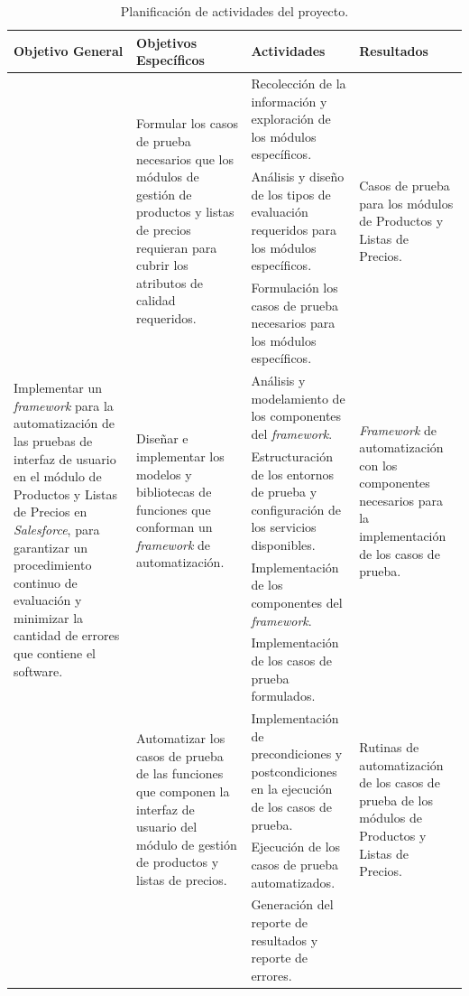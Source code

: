 \begin{table}
\renewcommand{\arraystretch}{1}
\linespread{1.25}
\centering
\small
\begin{tabular}{|l|l|p{6.5cm}|l|}
\hline
Objetivo General & Objetivos Específicos & Actividades & Resultados \\
\hline
\multirow{10}{4.0cm}{Implementar un \emph{framework} para la automatización de
las pruebas de interfaz de usuario en el módulo de Productos y Listas de Precios
en \emph{Salesforce}, para garantizar un procedimiento continuo de evaluación y
minimizar la cantidad de errores que contiene el software.} &
\multirow{3}{4.0cm}{Formular los casos de prueba necesarios que los módulos de
gestión de productos y listas de precios requieran para cubrir los atributos de
calidad requeridos.} &
Recolección de la información y exploración de los módulos específicos. &
\multirow{3}{4.0cm}{Casos de prueba para los módulos de Productos y Listas de
Precios.} \\
\cline{3-3}
& & Análisis y diseño de los tipos de evaluación requeridos para los módulos
específicos. & \\
\cline{3-3}
& & Formulación los casos de prueba necesarios para los módulos
específicos. & \\
\cline{2-4}
& \multirow{3}{4.0cm}{Diseñar e implementar los modelos y bibliotecas de
funciones que conforman un \emph{framework} de automatización.} &
Análisis y modelamiento de los componentes del \emph{framework}. &
\multirow{3}{4.0cm}{\emph{Framework} de automatización con los componentes
necesarios para la implementación de los casos de prueba.} \\
\cline{3-3}
& & Estructuración de los entornos de prueba y configuración de los servicios
disponibles. & \\
\cline{3-3}
& & Implementación de los componentes del \emph{framework}. & \\
\cline{2-4}
& \multirow{4}{4.0cm}{Automatizar los casos de prueba de las funciones que
componen la interfaz de usuario del módulo de gestión de productos y listas de
precios.} &
Implementación de los casos de prueba formulados. &
\multirow{4}{4.0cm}{Rutinas de automatización de los casos de prueba de los
módulos de Productos y Listas de Precios.} \\
\cline{3-3}
& & Implementación de precondiciones y postcondiciones en la ejecución de los
casos de prueba. & \\
\cline{3-3}
& & Ejecución de los casos de prueba automatizados. & \\
\cline{3-3}
& & Generación del reporte de resultados y reporte de errores. & \\
\hline
\end{tabular}
\caption{Planificación de actividades del proyecto.}
\label{planificacion}
\end{table}

